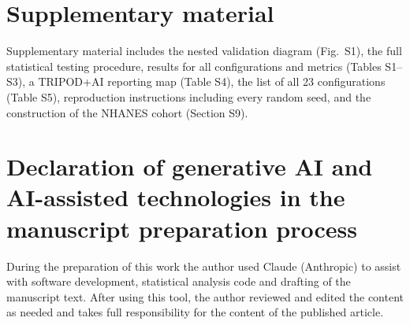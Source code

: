 \section*{Supplementary material}
Supplementary material includes the nested validation diagram (Fig.~S1), the full statistical testing procedure, results for all configurations and metrics (Tables S1--S3), a TRIPOD+AI reporting map (Table S4), the list of all 23 configurations (Table S5), reproduction instructions including every random seed, and the construction of the NHANES cohort (Section S9).

\section*{Declaration of generative AI and AI-assisted technologies in the manuscript preparation process}
During the preparation of this work the author used Claude (Anthropic) to assist with software development, statistical analysis code and drafting of the manuscript text. After using this tool, the author reviewed and edited the content as needed and takes full responsibility for the content of the published article.
